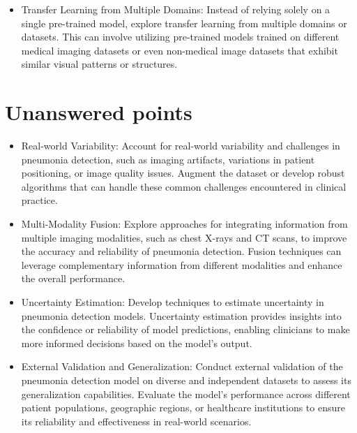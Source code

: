\begin{itemize}
\item Transfer Learning from Multiple Domains: Instead of relying solely on a single pre-trained model, explore transfer learning from multiple domains or datasets. This can involve utilizing pre-trained models trained on different medical imaging datasets or even non-medical image datasets that exhibit similar visual patterns or structures.\\

\end{itemize}

\section{Unanswered points}

\begin{itemize}
	\item Real-world Variability: Account for real-world variability and challenges in pneumonia detection, such as imaging artifacts, variations in patient positioning, or image quality issues. Augment the dataset or develop robust algorithms that can handle these common challenges encountered in clinical practice.
	\item Multi-Modality Fusion: Explore approaches for integrating information from multiple imaging modalities, such as chest X-rays and CT scans, to improve the accuracy and reliability of pneumonia detection. Fusion techniques can leverage complementary information from different modalities and enhance the overall performance.
	\item Uncertainty Estimation: Develop techniques to estimate uncertainty in pneumonia detection models. Uncertainty estimation provides insights into the confidence or reliability of model predictions, enabling clinicians to make more informed decisions based on the model's output.
	\item External Validation and Generalization: Conduct external validation of the pneumonia detection model on diverse and independent datasets to assess its generalization capabilities. Evaluate the model's performance across different patient populations, geographic regions, or healthcare institutions to ensure its reliability and effectiveness in real-world scenarios.
	
	
\end{itemize}

